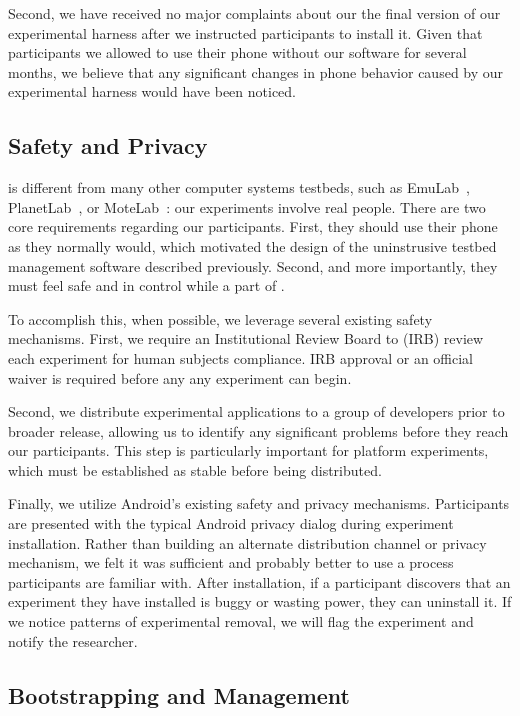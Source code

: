 Second, we have received no major complaints about our the final version of
our \PhoneLab{} experimental harness after we instructed participants to
install it. Given that participants we allowed to use their phone without our
software for several months, we believe that any significant changes in phone
behavior caused by our experimental harness would have been noticed.

\subsection{Safety and Privacy}

\PhoneLab{} is different from many other computer systems testbeds, such as
EmuLab~\cite{white:osdi:2002, emulab}, PlanetLab~\cite{peterson:ccr:2003,
planetlab}, or MoteLab~\cite{werner-allen:ipsn:2005}: our
experiments involve real people. There are two core requirements regarding
our participants. First, they should use their phone as they normally would,
which motivated the design of the uninstrusive testbed management software
described previously. Second, and more importantly, they must feel safe and
in control while a part of \PhoneLab{}.

To accomplish this, when possible, we leverage several existing safety
mechanisms. First, we require an Institutional Review Board to (IRB) review
each \PhoneLab{} experiment for human subjects compliance. IRB approval or an
official waiver is required before any \PhoneLab{} any experiment can begin.

Second, we distribute experimental applications to a group of developers
prior to broader release, allowing us to identify any significant problems
before they reach our participants. This step is particularly important for
platform experiments, which must be established as stable before being
distributed.

Finally, we utilize Android's existing safety and privacy mechanisms.
Participants are presented with the typical Android privacy dialog during
experiment installation. Rather than building an alternate distribution
channel or privacy mechanism, we felt it was sufficient and probably better
to use a process participants are familiar with. After installation, if a
participant discovers that an experiment they have installed is buggy or
wasting power, they can uninstall it. If we notice patterns of experimental
removal, we will flag the experiment and notify the researcher.

\subsection{Bootstrapping and Management}

